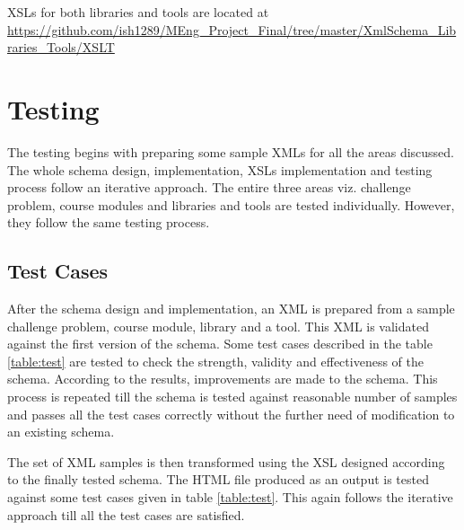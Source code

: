 \documentclass[11pt,letterpaper]{report}
\begin{document}
XSLs for both libraries and tools are located at 
\url{https://github.com/ish1289/MEng_Project_Final/tree/master/XmlSchema_Libraries_Tools/XSLT}


\chapter{Testing}

The testing begins with preparing some sample XMLs for all the areas discussed. The whole schema design, implementation, XSLs implementation and testing process follow an iterative approach. The entire three areas viz. challenge problem, course modules and libraries and tools are tested individually. However, they follow the same testing process. 
 
\section{Test Cases}
After the schema design and implementation, an XML is prepared from a sample challenge problem, course module, library and a tool. This XML is validated against the first version of the schema. Some test cases described in the table \ref{table:test} are tested to check the strength, validity and effectiveness of the schema. According to the results, improvements are made to the schema. This process is repeated till the schema is tested against reasonable number of samples and passes all the test cases correctly without the further need of modification to an existing schema. 

The set of XML samples is then transformed using the XSL designed according to the finally tested schema. The HTML file produced as an output is tested against some test cases given in table \ref{table:test}. This again follows the iterative approach till all the test cases are satisfied.
\end{document}
